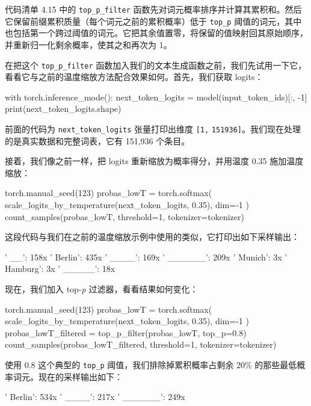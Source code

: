 代码清单 4.15 中的 \texttt{top\_p\_filter} 函数先对词元概率排序并计算其累积和。然后它保留前缀累积质量（每个词元之前的累积概率）低于 \texttt{top\_p} 阈值的词元，其中也包括第一个跨过阈值的词元。它把其余值置零，将保留的值映射回其原始顺序，并重新归一化剩余概率，使其之和再次为 1。

在把这个 \texttt{top\_p\_filter} 函数加入我们的文本生成函数之前，我们先试用一下它，看看它与之前的温度缩放方法配合效果如何。首先，我们获取 logits：

\begin{codebox}
with torch.inference_mode():
    next_token_logits = model(input_token_ids)[:, -1]
print(next_token_logits.shape)
\end{codebox}

前面的代码为 \texttt{next\_token\_logits} 张量打印出维度 \texttt{[1,} \texttt{151936]}。我们现在处理的是真实数据和完整词表，它有 151,936 个条目。

接着，我们像之前一样，把 logits 重新缩放为概率得分，并用温度 0.35 施加温度缩放：

\begin{codebox}
torch.manual_seed(123)
probas_lowT = torch.softmax(
    scale_logits_by_temperature(next_token_logits, 0.35), dim=-1
)
count_samples(probas_lowT, threshold=1, tokenizer=tokenizer)
\end{codebox}

这段代码与我们在之前的温度缩放示例中使用的类似，它打印出如下采样输出：

\begin{codebox}
' __': 158x
' Berlin': 435x
' ____': 169x
' ______': 209x
' Munich': 3x
' Hamburg': 3x
' _____': 18x
\end{codebox}

现在，我们加入 top-\emph{p} 过滤器，看看结果如何变化：

\begin{codebox}
torch.manual_seed(123)
probas_lowT = torch.softmax(
    scale_logits_by_temperature(next_token_logits, 0.35), dim=-1
)
probas_lowT_filtered = top_p_filter(probas_lowT, top_p=0.8)
count_samples(probas_lowT_filtered, threshold=1, tokenizer=tokenizer)
\end{codebox}

使用 0.8 这个典型的 \texttt{top\_p} 阈值，我们排除掉累积概率占剩余 20\% 的那些最低概率词元。现在的采样输出如下：

\begin{codebox}
' Berlin': 534x
' ____': 217x
' ______': 249x
\end{codebox}

